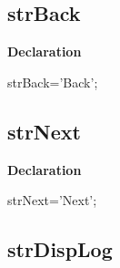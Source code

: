 \documentclass{report}
\newif\ifpdf
\begin{document}
\subsection*{strBack}
\fi
\label{trstrings-strBack}
\begin{list}{}{
\setlength{\itemindent}{0cm}
\setlength{\listparindent}{0cm}
\setlength{\leftmargin}{\evensidemargin}
\addtolength{\leftmargin}{\tmplength}
\settowidth{\labelsep}{X}
\addtolength{\leftmargin}{\labelsep}
\setlength{\labelwidth}{\tmplength}
}
\item[\textbf{Declaration}\hfill]
\ifpdf
\begin{flushleft}
\fi
\begin{ttfamily}
strBack='Back';\end{ttfamily}

\ifpdf
\end{flushleft}
\fi

\end{list}
\ifpdf
\subsection*{\large{\textbf{strNext}}\normalsize\hspace{1ex}\hrulefill}
\else
\subsection*{strNext}
\fi
\label{trstrings-strNext}
\begin{list}{}{
\setlength{\itemindent}{0cm}
\setlength{\listparindent}{0cm}
\setlength{\leftmargin}{\evensidemargin}
\addtolength{\leftmargin}{\tmplength}
\settowidth{\labelsep}{X}
\addtolength{\leftmargin}{\labelsep}
\setlength{\labelwidth}{\tmplength}
}
\item[\textbf{Declaration}\hfill]
\ifpdf
\begin{flushleft}
\fi
\begin{ttfamily}
strNext='Next';\end{ttfamily}

\ifpdf
\end{flushleft}
\fi

\end{list}
\ifpdf
\subsection*{\large{\textbf{strDispLog}}\normalsize\hspace{1ex}\hrulefill}
\else
\end{document}
